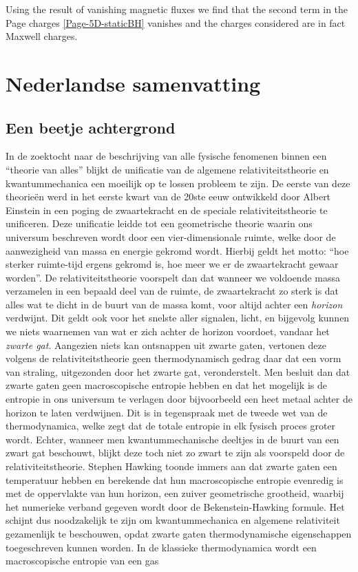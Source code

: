 \documentclass[12pt,twoside]{book}
\begin{document}
\begin{appendices}
Using the result of vanishing magnetic fluxes we find that the second term in the Page charges \eqref{Page-5D-staticBH} vanishes and the charges considered are in fact Maxwell charges.

\chapter{Nederlandse samenvatting}

\section{Een beetje achtergrond}

In de zoektocht naar de beschrijving van alle fysische fenomenen binnen een ``theorie van alles'' blijkt de unificatie van de algemene relativiteitstheorie en kwantummechanica een moeilijk op te lossen probleem te zijn. De eerste van deze theorie\"en werd in het eerste kwart van de 20ste eeuw ontwikkeld door \linebreak[3]Albert Einstein in een poging de zwaartekracht en de speciale relativiteitstheorie te unificeren. Deze unificatie leidde tot een geometrische theorie waarin ons universum beschreven wordt door een vier-dimensionale ruimte, welke door de aanwezigheid van massa en energie gekromd wordt. Hierbij geldt het motto: ``hoe sterker ruimte-tijd ergens gekromd is, hoe meer we er de zwaartekracht gewaar worden''. De relativiteitstheorie voorspelt dan dat wanneer we voldoende massa verzamelen in een bepaald deel van de ruimte, de zwaartekracht zo sterk is dat alles wat te dicht in de buurt van de massa komt, voor altijd achter een \emph{horizon} verdwijnt. Dit geldt ook voor het snelste aller signalen, licht, en bijgevolg kunnen we niets waarnemen van wat er zich achter de horizon voordoet, vandaar het \emph{zwarte gat}. Aangezien niets kan ontsnappen uit zwarte gaten, vertonen deze volgens de relativiteitstheorie geen thermodynamisch gedrag daar dat een vorm van straling, uitgezonden door het zwarte gat, veronderstelt. Men besluit dan dat zwarte gaten geen macroscopische entropie hebben en dat het mogelijk is de entropie in ons universum te verlagen door bijvoorbeeld een heet metaal achter de horizon te laten verdwijnen. Dit is in tegenspraak met de tweede wet van de thermodynamica, welke zegt dat de totale entropie in elk fysisch proces groter wordt. Echter, wanneer men kwantummechanische deeltjes in de buurt van een zwart gat beschouwt, blijkt deze toch niet zo zwart te zijn als voorspeld door de relativiteitstheorie. Stephen Hawking toonde immers aan dat zwarte gaten een temperatuur hebben en berekende dat hun macroscopische entropie evenredig is met de oppervlakte van hun horizon, een zuiver geometrische grootheid, waarbij het numerieke verband gegeven wordt door de Bekenstein-Hawking formule. Het schijnt dus noodzakelijk te zijn om kwantummechanica en algemene relativiteit gezamenlijk te beschouwen, opdat zwarte gaten thermodynamische eigenschappen toegeschreven kunnen worden. In de klassieke thermodynamica wordt een macroscopische entropie van een gas 
\end{appendices}
\end{document}
